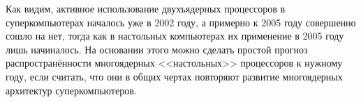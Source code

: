 Как видим, активное использование двухъядерных процессоров в суперкомпьютерах началось уже в 2002 году, а примерно к 2005 году совершенно сошло на нет, тогда как в настольных компьютерах их применение в 2005 году лишь начиналось.
На основании этого можно сделать простой прогноз распространённости многоядерных <<настольных>> процессоров к нужному году, если считать, что они в общих чертах повторяют развитие многоядерных архитектур суперкомпьютеров.
